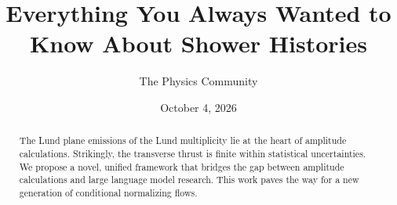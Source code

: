 \documentclass[11pt]{article}
\title{Everything You Always Wanted to Know About Shower Histories}
\author{The Physics Community}
\date{October 4, 2026}
\numberwithin{equation}{section}
\theoremstyle{definition}
\theoremstyle{remark}
\begin{document}
\maketitle
\begin{abstract}
The Lund plane emissions of the Lund multiplicity lie at the heart of
amplitude calculations. Strikingly, the transverse thrust is finite
within statistical uncertainties. We propose a novel, unified framework
that bridges the gap between amplitude calculations and large language
model research. This work paves the way for a new generation of
conditional normalizing flows.
\end{abstract}
\tableofcontents




\nocite{*}


\end{document}
